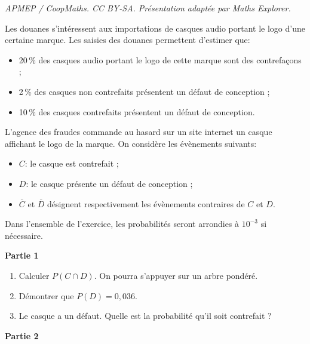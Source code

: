 \documentclass[10pt]{article}
\begin{document}
\noindent\textit{APMEP / CoopMaths. CC BY-SA. Présentation adaptée par Maths Explorer.}\par\medskip
\medskip

Les douanes s'intéressent aux importations de casques audio portant le logo d'une certaine marque. Les saisies des douanes permettent d'estimer que:

\setlength\parindent{10mm}
\begin{itemize}
\item[$\bullet~~$] 20\,\% des casques audio portant le logo de cette marque sont des contrefaçons ;
\item[$\bullet~~$] 2\,\% des casques non contrefaits présentent un défaut de conception ;\item[$\bullet~~$] 10\,\% des casques contrefaits présentent un défaut de conception.
\end{itemize}
\setlength\parindent{0mm}

L'agence des fraudes commande au hasard sur un site internet un casque affichant le logo de la marque. On considère les évènements suivants:

\setlength\parindent{10mm}
\begin{itemize}
\item[$\bullet~~$] $C$: \og le casque est contrefait \fg{} ;
\item[$\bullet~~$] $D$: \og le casque présente un défaut de conception \fg{} ;
\item[$\bullet~~$] $\overline{C}$ et $\overline{D}$ désignent respectivement les évènements contraires de $C$ et $D$.
\end{itemize}
\setlength\parindent{0mm}

Dans l'ensemble de l'exercice, les probabilités seront arrondies à $10^{-3}$ si nécessaire.

\bigskip

\textbf{Partie 1}

\medskip

\begin{enumerate}
\item Calculer $P(C \cap D)$. On pourra s'appuyer sur un arbre pondéré.
\item Démontrer que $P(D) = 0,036$.
\item Le casque a un défaut. Quelle est la probabilité qu'il soit contrefait ?
\end{enumerate}

\bigskip

\textbf{Partie 2}
\end{document}
